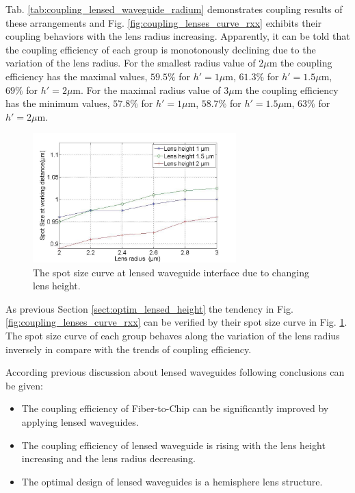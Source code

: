Tab. \ref{tab:coupling_lensed_waveguide_radium} demonstrates coupling results of these arrangements and Fig. \ref{fig:coupling_lenses_curve_rxx} exhibits their coupling behaviors with the lens radius increasing. Apparently, it can be told that the coupling efficiency of each group is monotonously declining due to the variation of the lens radius. For the smallest radius value of $2\mu$m the coupling efficiency has the maximal values, $59.5\%$ for $h'=1\mu$m, $61.3\%$ for $h'=1.5\mu$m, $69\%$ for $h'=2\mu$m. For the maximal radius value of $3\mu$m the coupling efficiency has the minimum values, $57.8\%$ for $h'=1\mu$m, $58.7\%$ for $h'=1.5\mu$m, $63\%$ for $h'=2\mu$m.\\

\begin{figure}[!ht]
\centering
\includegraphics[width=0.7\textwidth]{bilder/spot_fix_lens_height_rxx}
\caption{The spot size curve at lensed waveguide interface due to changing lens height.}
\label{fig:lensed_guide_spot_size_curve_rxx}
\end{figure}
As previous Section \ref{sect:optim_lensed_height} the tendency in Fig. \ref{fig:coupling_lenses_curve_rxx} can be verified by their spot size curve in Fig. \ref{fig:lensed_guide_spot_size_curve_rxx}. The spot size curve of each group behaves along the variation of the lens radius inversely in compare with the trends of coupling efficiency. 

 According previous discussion about lensed waveguides following conclusions can be given: 
\begin{itemize} 
\item The coupling efficiency of Fiber-to-Chip can be significantly improved by applying lensed waveguides.  
\item The coupling efficiency of lensed waveguide is rising with the lens height increasing and the lens radius decreasing.
\item The optimal design of lensed waveguides is a hemisphere lens structure. 
\end{itemize}
